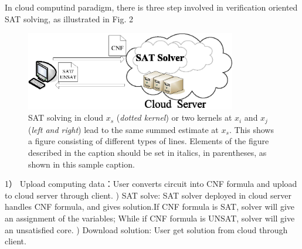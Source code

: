 \documentclass[runningheads,a4paper]{llncs}
\begin{document}
In cloud computind paradigm, there is three step involved in verification oriented SAT solving, as illustrated in Fig. 2
\begin{figure}
\centering
\includegraphics[width=9.2cm]{a2}
\caption{SAT solving in cloud $x_s$ (\emph{dotted kernel}) or two kernels at
$x_i$ and $x_j$ (\textit{left and right}) lead to the same summed estimate
at $x_s$. This shows a figure consisting of different types of
lines. Elements of the figure described in the caption should be set in
italics, in parentheses, as shown in this sample caption.}
\label{fig:example}
\end{figure}
1） Upload computing data：User converts circuit into CNF formula and upload to cloud server through client.
)  SAT solve: SAT solver deployed in cloud server handles CNF formula, and gives solution.If CNF formula is SAT, solver will give an assignment of the variables; While if CNF formula is UNSAT, solver will give an unsatisfied core.{}
)  Download solution: User get solution from cloud through client.{}
\end{document}
